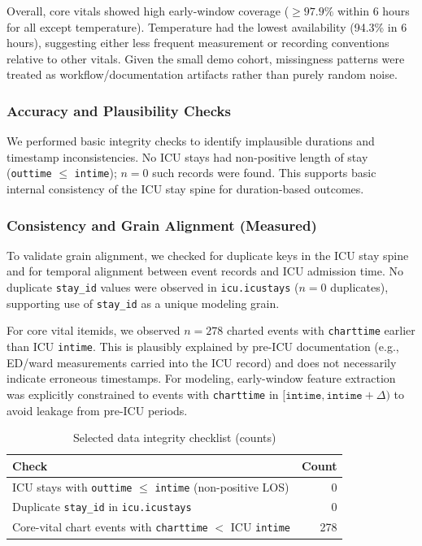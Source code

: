 \documentclass[12pt]{article}
\begin{document}
Overall, core vitals showed high early-window coverage (\(\geq 97.9\%\) within 6 hours for all except temperature). Temperature had the lowest availability (94.3\% in 6 hours), suggesting either less frequent measurement or recording conventions relative to other vitals. Given the small demo cohort, missingness patterns were treated as workflow/documentation artifacts rather than purely random noise.

\subsubsection*{Accuracy and Plausibility Checks}
We performed basic integrity checks to identify implausible durations and timestamp inconsistencies. No ICU stays had non-positive length of stay (\texttt{outtime} \(\le\) \texttt{intime}); \(n=0\) such records were found. This supports basic internal consistency of the ICU stay spine for duration-based outcomes.

\subsubsection*{Consistency and Grain Alignment (Measured)}
To validate grain alignment, we checked for duplicate keys in the ICU stay spine and for temporal alignment between event records and ICU admission time.
No duplicate \texttt{stay\_id} values were observed in \texttt{icu.icustays} (\(n=0\) duplicates), supporting use of \texttt{stay\_id} as a unique modeling grain.

For core vital itemids, we observed \(n=278\) charted events with \texttt{charttime} earlier than ICU \texttt{intime}. This is plausibly explained by pre-ICU documentation (e.g., ED/ward measurements carried into the ICU record) and does not necessarily indicate erroneous timestamps. For modeling, early-window feature extraction was explicitly constrained to events with \texttt{charttime} in \([\texttt{intime}, \texttt{intime}+\Delta)\) to avoid leakage from pre-ICU periods.

\begin{table}[H]
\centering
\caption{Selected data integrity checklist (counts)}
\label{tab:dq_checklist}
\begin{tabular}{p{8.2cm} r}
\toprule
\textbf{Check} & \textbf{Count} \\
\midrule
ICU stays with \texttt{outtime} \(\le\) \texttt{intime} (non-positive LOS) & 0 \\
Duplicate \texttt{stay\_id} in \texttt{icu.icustays} & 0 \\
Core-vital chart events with \texttt{charttime} \(<\) ICU \texttt{intime} & 278 \\
\bottomrule
\end{tabular}
\end{table}
\end{document}

